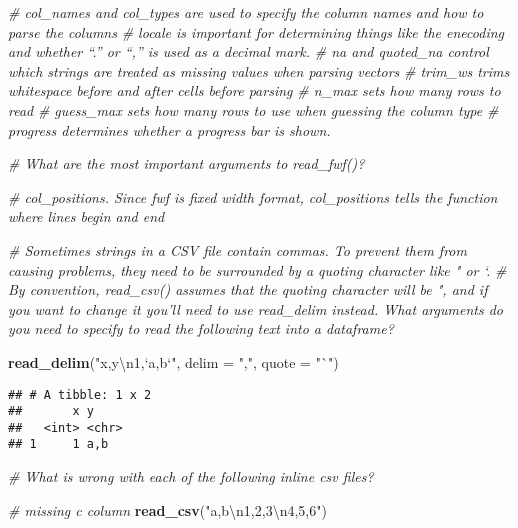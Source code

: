 \documentclass[]{article}
\newenvironment{Shaded}{\begin{snugshade}}{\end{snugshade}}
\newcommand{\KeywordTok}[1]{\textcolor[rgb]{0.13,0.29,0.53}{\textbf{#1}}}
\newcommand{\DataTypeTok}[1]{\textcolor[rgb]{0.13,0.29,0.53}{#1}}
\newcommand{\CharTok}[1]{\textcolor[rgb]{0.31,0.60,0.02}{#1}}
\newcommand{\StringTok}[1]{\textcolor[rgb]{0.31,0.60,0.02}{#1}}
\newcommand{\CommentTok}[1]{\textcolor[rgb]{0.56,0.35,0.01}{\textit{#1}}}
\newcommand{\NormalTok}[1]{#1}
\begin{document}
\begin{Shaded}
\begin{Highlighting}[]
\CommentTok{# col_names and col_types are used to specify the column names and how to parse the columns}
\CommentTok{# locale is important for determining things like the enecoding and whether “.” or “,” is used as a decimal mark.}
\CommentTok{# na and quoted_na control which strings are treated as missing values when parsing vectors}
\CommentTok{# trim_ws trims whitespace before and after cells before parsing}
\CommentTok{# n_max sets how many rows to read}
\CommentTok{# guess_max sets how many rows to use when guessing the column type}
\CommentTok{# progress determines whether a progress bar is shown.}

\CommentTok{# What are the most important arguments to read_fwf()?}

\CommentTok{# col_positions. Since fwf is fixed width format, col_positions tells the function where lines begin and end}

\CommentTok{# Sometimes strings in a CSV file contain commas. To prevent them from causing problems, they need to be surrounded by a quoting character like " or `.}
\CommentTok{# By convention, read_csv() assumes that the quoting character will be ", and if you want to change it you'll need to use read_delim instead. What arguments do you need to specify to read the following text into a dataframe? }

\KeywordTok{read_delim}\NormalTok{(}\StringTok{"x,y}\CharTok{\textbackslash{}n}\StringTok{1,`a,b`"}\NormalTok{, }\DataTypeTok{delim =} \StringTok{","}\NormalTok{, }\DataTypeTok{quote =} \StringTok{"`"}\NormalTok{)}
\end{Highlighting}
\end{Shaded}

\begin{verbatim}
## # A tibble: 1 x 2
##       x y    
##   <int> <chr>
## 1     1 a,b
\end{verbatim}

\begin{Shaded}
\begin{Highlighting}[]
\CommentTok{# What is wrong with each of the following inline csv files? }

\CommentTok{# missing c column }
\KeywordTok{read_csv}\NormalTok{(}\StringTok{"a,b}\CharTok{\textbackslash{}n}\StringTok{1,2,3}\CharTok{\textbackslash{}n}\StringTok{4,5,6"}\NormalTok{)}
\end{Highlighting}
\end{Shaded}
\end{document}

